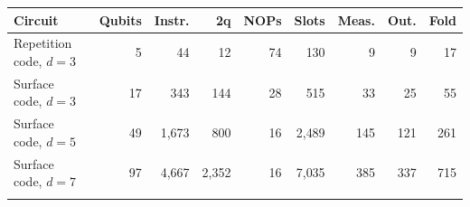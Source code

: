\begin{tabular}{@{}lrrrrrrrr@{}}
\toprule
Circuit & Qubits & Instr. & 2q & NOPs & Slots & Meas. & Out. & Fold \\
\midrule
Repetition code, $d=3$ & 5 & 44 & 12 & 74 & 130 & 9 & 9 & 17 \\
Surface code, $d=3$ & 17 & 343 & 144 & 28 & 515 & 33 & 25 & 55 \\
Surface code, $d=5$ & 49 & 1{,}673 & 800 & 16 & 2{,}489 & 145 & 121 & 261 \\
Surface code, $d=7$ & 97 & 4{,}667 & 2{,}352 & 16 & 7{,}035 & 385 & 337 & 715 \\
\botrule
\end{tabular}
